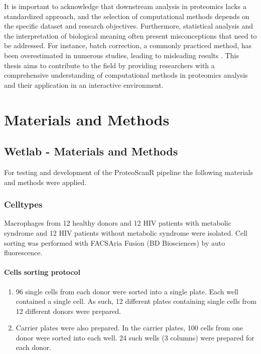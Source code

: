 \documentclass[
  11pt,
]{article}
\begin{document}
It is important to acknowledge that downstream analysis in proteomics lacks a standardized approach, and the selection of computational methods depends on the specific dataset and research objectives. Furthermore, statistical analysis and the interpretation of biological meaning often present misconceptions that need to be addressed. For instance, batch correction, a commonly practiced method, has been overestimated in numerous studies, leading to misleading results \citep{Nygaard2016}. This thesis aims to contribute to the field by providing researchers with a comprehensive understanding of computational methods in proteomics analysis and their application in an interactive environment.

\newpage

\hypertarget{materials-and-methods}{%
\section{Materials and Methods}\label{materials-and-methods}}

\hypertarget{wetlab---materials-and-methods}{%
\subsection{Wetlab - Materials and Methods}\label{wetlab---materials-and-methods}}

For testing and development of the ProteoScanR pipeline the following materials and methods were applied.

\hypertarget{celltypes}{%
\subsubsection{Celltypes}\label{celltypes}}

Macrophages from 12 healthy donors and 12 HIV patients with metabolic syndrome and 12 HIV patients without metabolic syndrome were isolated. Cell sorting was performed with FACSAria Fusion (BD Biosciences) by auto fluorescence.

\hypertarget{cells-sorting-protocol}{%
\paragraph{Cells sorting protocol}\label{cells-sorting-protocol}}

\begin{enumerate}
\item 96 single cells from each donor were sorted into a single plate. Each well contained a single cell. As such, 12 different plates containing single cells from 12 different donors were prepared. 
\item Carrier plates were also prepared. In the carrier plates, 100 cells from one donor were sorted into each well. 24 such wells (3 columns) were prepared for each donor.
\end{enumerate}
\end{document}
